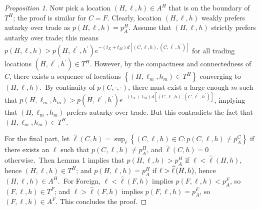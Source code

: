 \documentclass[12pt]{article}
\begin{document}
\begin{proof}[Proposition 1]
Now pick a location $\left( H,\ell ,h\right) \in A^{H}$ that is on the
boundary of $T^{H}$; the proof is similar for $C=F$. Clearly, location $%
\left( H,\ell ,h\right) $ weakly prefers autarky over trade as $p\left(
H,\ell ,h\right) =p_{A}^{H}$. Assume that $\left( H,\ell ,h\right) $
strictly prefers autarky over trade; this means $p\left( H,\ell ,h\right)
>p\left( H,\ell ^{\prime },h^{\prime }\right) e^{-\left( t_{X}+t_{M}\right) d%
\left[ \left( C,\ell ,h\right) ,\left( C,\ell ^{\prime },h^{\prime }\right) %
\right] }$ for all trading locations $\left( H,\ell ^{\prime },h^{\prime
}\right) \in T^{H}$. However, by the compactness and connectedness of $C$,
there exists a sequence of locations $\left \{ \left( H,\ell
_{m},h_{m}\right) \in T^{H}\right \} $ converging to $\left( H,\ell ,h\right) 
$.\ By continuity of $p\left( C,\cdot ,\cdot \right) $, there must exist a
large enough $m$ such that $p\left( H,\ell _{m},h_{m}\right) >p\left( H,\ell
^{\prime },h^{\prime }\right) e^{-\left( t_{X}+t_{M}\right) d\left[ \left(
C,\ell ,h\right) ,\left( C,\ell ^{\prime },h^{\prime }\right) \right] }$,
implying that $\left( H,\ell _{m},h_{m}\right) $ prefers autarky over
trade. But this contradicts the fact that $\left( H,\ell _{m},h_{m}\right)
\in T^{H}$.

For the final part, let $\widehat{\ell }\left( C,h\right) =\sup_{\ell
}\left \{ \left( C,\ell ,h\right) \in C:p\left( C,\ell ,h\right) \neq
p_{A}^{C}\right \} $ if there exists an $\ell $ such that $p\left( C,\ell
,h\right) \neq p_{A}^{H}$, and $\widehat{\ell }\left( C,h\right) =0$
otherwise.\ Then Lemma 1 implies that $p\left( H,\ell ,h\right) >p_{A}^{H}$
if $\ell <\widehat{\ell }\left( H,h\right) $, hence $\left( H,\ell ,h\right)
\in T^{H}$; and $p\left( H,\ell ,h\right) =p_{A}^{H}$ if $\ell >\widehat{%
\ell }\left( H,h\right) $, hence $\left( H,\ell ,h\right) \in A^{H}$.\ For
Foreign, $\ell <\widehat{\ell }\left( F,h\right) $ implies $p\left( F,\ell
,h\right) <p_{A}^{F}$, so $\left( F,\ell ,h\right) \in T^{F}$; and $\ell >%
\widehat{\ell }\left( F,h\right) $ implies $p\left( F,\ell ,h\right)
=p_{A}^{F}$, so $\left( F,\ell ,h\right) \in A^{F}$. This concludes the
proof.
\end{proof}
\end{document}
